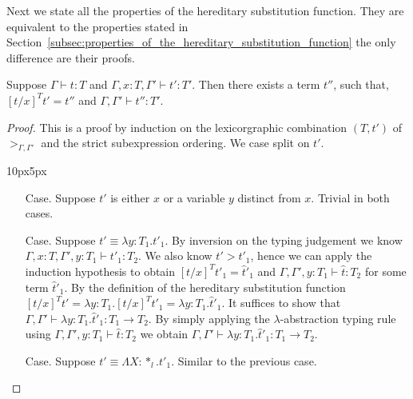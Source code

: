 \noindent Next we state all the properties of the hereditary
substitution function.  They are equivalent to the properties stated
in
Section~\ref{subsec:properties_of_the_hereditary_substitution_function}
the only difference are their proofs.
\begin{lemma}
  \label{lemma:total_ssf}
  Suppose $\Gamma \vdash t : T$ and $\Gamma, x:T, \Gamma' \vdash t':T'$. Then
  there exists a term $t''$, such that, $[t/x]^T t' = t''$ and $\Gamma,\Gamma' \vdash t'':T'$.
\end{lemma}
\begin{proof}
  This is a proof by induction on the lexicorgraphic combination $(T, t')$ of $>_{\Gamma,\Gamma'}$ and
the strict subexpression ordering.  We case split on $t'$.
\vspace{-25px}
\begin{changemargin}{10px}{5px}\noindent
\begin{itemize}
\item[Case.] Suppose $t'$ is either $x$ or a variable $y$ distinct from $x$.  
  Trivial in both cases.
  
\item[Case.] Suppose $t' \equiv \lambda y:T_1.t'_1$.  By inversion on the
  typing judgement we know $\Gamma,x:T,\Gamma',y:T_1 \vdash t'_1:T_2$.
  We also know $t' > t'_1$, hence we can apply the induction hypothesis to obtain
  $[t/x]^T t'_1 = \hat{t}'_1$ and $\Gamma,\Gamma',y:T_1 \vdash \hat{t}:T_2$
  for some term $\hat{t}'_1$.  By the definition of the hereditary substitution function 
  $[t/x]^T t' = \lambda y:T_1.[t/x]^T t'_1 = \lambda y:T_1.\hat{t}'_1$.  It suffices
  to show that $\Gamma,\Gamma' \vdash \lambda y:T_1.\hat{t}'_1:T_1 \to T_2$.  
  By simply applying the $\lambda$-abstraction typing rule using
  $\Gamma,\Gamma',y:T_1 \vdash \hat{t}:T_2$ we obtain 
  $\Gamma,\Gamma' \vdash \lambda y:T_1.\hat{t}'_1:T_1 \to T_2$.
  
\item[Case.] Suppose $t' \equiv \Lambda X:*_l.t'_1$.  Similar to the previous case.
  

\end{itemize}
\end{changemargin}
\end{proof}
